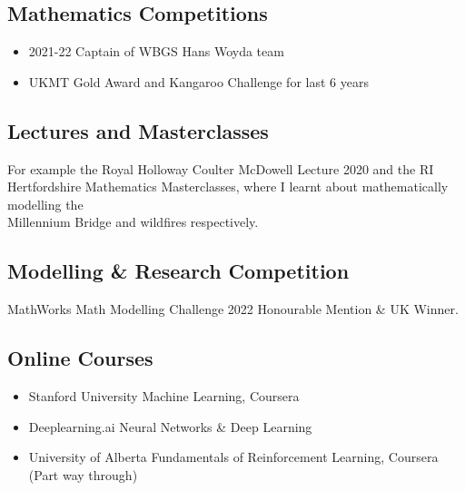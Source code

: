 \documentclass{Resume}
\begin{document}
		\subsection{Mathematics Competitions}
			\begin{itemize}[itemsep=1mm, parsep=0pt]
				\item 2021-22 Captain of WBGS Hans Woyda team
				\item UKMT Gold Award and Kangaroo Challenge for last 6 years
			\end{itemize}
		\subsection{Lectures and Masterclasses}
			For example the Royal Holloway Coulter McDowell Lecture 2020 and the RI Hertfordshire Mathematics Masterclasses, where I learnt about mathematically modelling the \\ Millennium Bridge and wildfires respectively.

		\subsection{Modelling \& Research Competition}
			MathWorks Math Modelling Challenge 2022 Honourable Mention \& UK Winner.
			
		\subsection{Online Courses}
			\begin{itemize}[itemsep=1mm, parsep=0pt]
				\item Stanford University Machine Learning, Coursera
				\item Deeplearning.ai Neural Networks \& Deep Learning
				\item University of Alberta Fundamentals of Reinforcement Learning, Coursera (Part way through)
			\end{itemize}



\end{document}
